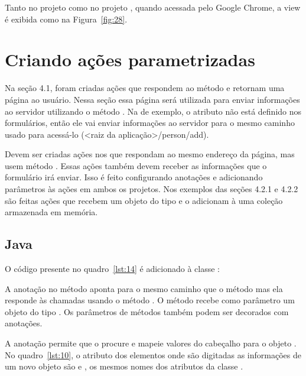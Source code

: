Tanto no projeto  como no projeto , quando acessada pelo Google Chrome, a view é exibida como na Figura~\ref{fig:28}. 


\section{Criando ações parametrizadas}

Na seção 4.1, foram criadas ações que respondem ao método  e retornam uma página ao usuário. Nessa seção essa página será utilizada para enviar informações ao servidor utilizando o método . Na  de exemplo, o atributo  não está definido nos formulários, então ele vai enviar informações ao servidor para o mesmo caminho usado para acessá-lo (<raiz da aplicação>/person/add).

Devem ser criadas ações nos  que respondam ao mesmo endereço da página, mas usem método . Essas ações também devem receber as informações que o formulário irá enviar. Isso é feito configurando anotações e adicionando parâmetros às ações em ambos os projetos. Nos exemplos das seções 4.2.1 e 4.2.2 são feitas ações que recebem um objeto do tipo  e o adicionam à uma coleção armazenada em memória.

\subsection{Java}

O código presente no quadro~\ref{lst:14} é adicionado à classe :


A anotação  no método  aponta para o mesmo caminho que o método  mas ela responde às chamadas usando o método . O método  recebe como parâmetro um objeto do tipo . Os parâmetros de métodos também podem ser decorados com anotações.

A anotação  permite que o  procure e mapeie valores do cabeçalho  para o objeto . No quadro~\ref{lst:10}, o atributo  dos elementos  onde são digitadas as informações de um novo objeto são  e , os mesmos nomes dos atributos da classe .

